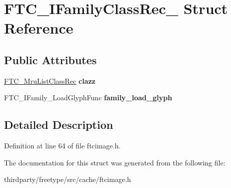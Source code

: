 \hypertarget{struct_f_t_c___i_family_class_rec__}{}\section{F\+T\+C\+\_\+\+I\+Family\+Class\+Rec\+\_\+ Struct Reference}
\label{struct_f_t_c___i_family_class_rec__}
\subsection*{Public Attributes}
\begin{DoxyCompactItemize}
\item 
\mbox{\label{struct_f_t_c___i_family_class_rec___a2490821b484afe33829ba3a302593760}} 
\hyperlink{struct_f_t_c___mru_list_class_rec__}{F\+T\+C\+\_\+\+Mru\+List\+Class\+Rec} {\bfseries clazz}
\item 
\mbox{\label{struct_f_t_c___i_family_class_rec___a32eae98a413c990fe0f4b83906b3cbb8}} 
F\+T\+C\+\_\+\+I\+Family\+\_\+\+Load\+Glyph\+Func {\bfseries family\+\_\+load\+\_\+glyph}
\end{DoxyCompactItemize}


\subsection{Detailed Description}


Definition at line 64 of file ftcimage.\+h.



The documentation for this struct was generated from the following file\+:\begin{DoxyCompactItemize}
\item 
thirdparty/freetype/src/cache/ftcimage.\+h\end{DoxyCompactItemize}
